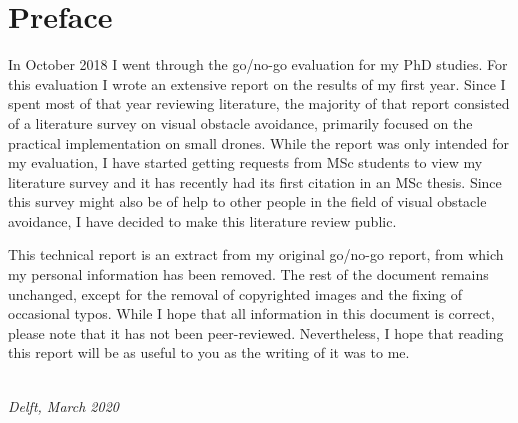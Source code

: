 \chapter*{Preface}


In October 2018 I went through the go/no-go evaluation for my PhD studies.
For this evaluation I wrote an extensive report on the results of my first year. 
Since I spent most of that year reviewing literature, the majority of that report consisted of a literature survey on visual obstacle avoidance, primarily focused on the practical implementation on small drones.
While the report was only intended for my evaluation, I have started getting requests from MSc students to view my literature survey and it has recently had its first citation in an MSc thesis.
Since this survey might also be of help to other people in the field of visual obstacle avoidance, I have decided to make this literature review public.

\medskip

This technical report is an extract from my original go/no-go report, from which my personal information has been removed.
The rest of the document remains unchanged, except for the removal of copyrighted images and the fixing of occasional typos.
While I hope that all information in this document is correct, please note that it has not been peer-reviewed.
Nevertheless, I hope that reading this report will be as useful to you as the writing of it was to me.

\vspace{0.3cm}

\begin{flushright}
{\makeatletter\itshape
    \@author \\
    Delft, March 2020
\makeatother}
\end{flushright}

